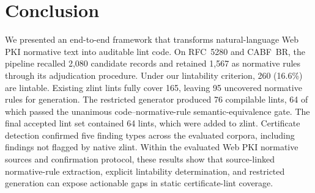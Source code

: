 \section{Conclusion}
\label{sec:conclusion}

We presented an end-to-end framework that transforms natural-language Web PKI
normative text into auditable lint code. On RFC~5280 and CABF~BR, the
pipeline recalled 2,080 candidate records and retained 1,567 as normative rules through
its adjudication procedure.
Under our lintability criterion, 260 (16.6\%) are lintable.
Existing zlint lints fully cover 165, leaving 95 uncovered normative rules for generation.
The restricted generator produced 76 compilable lints, 64 of which passed the unanimous code--normative-rule
semantic-equivalence gate. The final accepted
lint set contained 64 lints, which were added to zlint. Certificate detection confirmed five
finding types across the evaluated corpora, including findings not flagged by
native zlint. Within the evaluated Web PKI normative sources and confirmation protocol, these
results show that source-linked normative-rule extraction, explicit lintability
determination, and restricted generation can expose actionable gaps in static
certificate-lint coverage.

